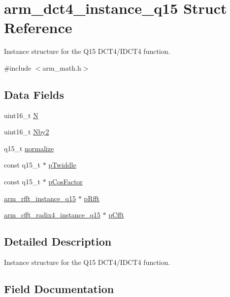 \hypertarget{structarm__dct4__instance__q15}{}\section{arm\+\_\+dct4\+\_\+instance\+\_\+q15 Struct Reference}
\label{structarm__dct4__instance__q15}


Instance structure for the Q15 D\+C\+T4/\+I\+D\+C\+T4 function.  




{\ttfamily \#include $<$arm\+\_\+math.\+h$>$}

\subsection*{Data Fields}
\begin{DoxyCompactItemize}
\item 
uint16\+\_\+t \mbox{\hyperlink{structarm__dct4__instance__q15_a37d49571fe35012087153c093705cd11}{N}}
\item 
uint16\+\_\+t \mbox{\hyperlink{structarm__dct4__instance__q15_afa64b1618089e35c2b55cff71cb29715}{Nby2}}
\item 
q15\+\_\+t \mbox{\hyperlink{structarm__dct4__instance__q15_a8ba8c9fa75542dac82553fee982ccd3e}{normalize}}
\item 
const q15\+\_\+t $\ast$ \mbox{\hyperlink{structarm__dct4__instance__q15_a7f19217cfa0370f9e518caa882265386}{p\+Twiddle}}
\item 
const q15\+\_\+t $\ast$ \mbox{\hyperlink{structarm__dct4__instance__q15_a86cbfbde15fcedaa49e2548f5fd85d95}{p\+Cos\+Factor}}
\item 
\mbox{\hyperlink{structarm__rfft__instance__q15}{arm\+\_\+rfft\+\_\+instance\+\_\+q15}} $\ast$ \mbox{\hyperlink{structarm__dct4__instance__q15_aea6aa42c838f2b22c8c31e9e259b8d75}{p\+Rfft}}
\item 
\mbox{\hyperlink{structarm__cfft__radix4__instance__q15}{arm\+\_\+cfft\+\_\+radix4\+\_\+instance\+\_\+q15}} $\ast$ \mbox{\hyperlink{structarm__dct4__instance__q15_ae0ac7c3a89699793fc0dac960db7f056}{p\+Cfft}}
\end{DoxyCompactItemize}


\subsection{Detailed Description}
Instance structure for the Q15 D\+C\+T4/\+I\+D\+C\+T4 function. 

\subsection{Field Documentation}
\mbox{\label{structarm__dct4__instance__q15_a37d49571fe35012087153c093705cd11}} 
